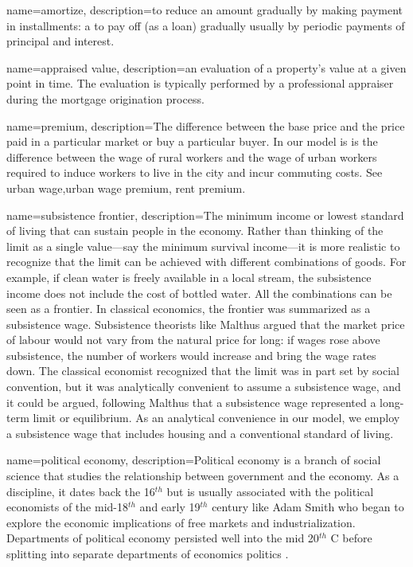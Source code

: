 {
name=amortize,
description={to reduce an amount gradually by making payment in installments: a to pay off (as a loan) gradually usually by periodic payments of principal and interest. }
}

{
name=appraised value,
description={an evaluation of a property's value at a given point in time. The evaluation is typically performed by a professional appraiser during the mortgage origination process.}
}

{
name=premium,
description={The difference between the base price and the price paid in a particular market or buy a particular buyer. In our model is is the difference between the wage of rural workers and the wage of urban workers required to induce workers to live in the city and incur commuting costs. See \gls{urban wage},\gls{urban wage premium}, \gls{rent premium}.}
}

{
name=subsistence frontier,
description={The minimum income or lowest standard of living that can sustain people in the economy. Rather than thinking of the limit as a single value---say the minimum survival income---it is more realistic to recognize that the limit can be achieved with different combinations of goods. For example, if clean water is freely available in a local stream, the subsistence income does not include the cost of bottled water. All the combinations can be seen as a \gls{frontier}. \newline In classical economics, the frontier was summarized as a subsistence wage. Subsistence theorists like Malthus argued that the market price of labour would not vary from the natural price for long: if wages rose above subsistence, the number of workers would increase and bring the wage rates down. The classical economist recognized that the limit was in part set by social convention, but it was analytically convenient to assume a subsistence wage, and it could be argued, following Malthus that a subsistence wage  represented a long-term limit or \gls{equilibrium}. As an analytical convenience in our model, we employ a subsistence wage that includes housing and a conventional standard of living.  }
}

{
name=political economy,
description={Political economy is a branch of social science that studies the relationship  between government and the economy. As a discipline, it dates back the  16$^{th}$ but is usually associated with the political economists of the mid-18$^{th}$ and  early 19$^{th}$  century like Adam Smith who began to explore the economic implications of free markets and industrialization. Departments of political economy persisted well into the mid 20$^{th}$ C before splitting into separate departments of economics politics \cite{helleiner20PoliticalEconomy2018}.}
}

